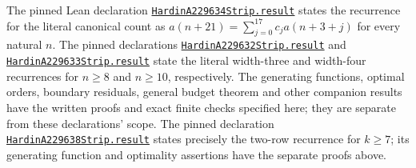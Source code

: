 \documentclass[11pt]{article}
\begin{document}


The pinned Lean declaration
\href{https://github.com/the-omega-institute/trureturing/blob/9849c0d81bfe0a953a10ad37400f5b1b61f028b5/D5/S3/StatisticalMechanics/Potts/CrossedStripDefectsWide/HardinA229634Strip.lean}{\texttt{HardinA229634Strip.result}}
states the recurrence for the literal canonical count as
$a(n+21)=\sum_{j=0}^{17}c_j a(n+3+j)$ for every natural $n$.
The pinned declarations
\href{https://github.com/the-omega-institute/trureturing/blob/9849c0d81bfe0a953a10ad37400f5b1b61f028b5/D5/S3/StatisticalMechanics/Potts/CrossedStripDefects/HardinA229632Strip.lean}{\texttt{HardinA229632Strip.result}}
and
\href{https://github.com/the-omega-institute/trureturing/blob/9849c0d81bfe0a953a10ad37400f5b1b61f028b5/D5/S3/StatisticalMechanics/Potts/CrossedStripDefects/HardinA229633Strip.lean}{\texttt{HardinA229633Strip.result}}
state the literal width-three and width-four recurrences for $n\geq8$
and $n\geq10$, respectively. The generating functions, optimal orders,
boundary residuals, general budget theorem and other companion results
have the written proofs and exact finite checks specified here;
they are separate from these declarations' scope.
The pinned declaration
\href{https://github.com/the-omega-institute/trureturing/blob/9849c0d81bfe0a953a10ad37400f5b1b61f028b5/D5/S3/StatisticalMechanics/Potts/StripDefects/HardinA229638Strip.lean}{\texttt{HardinA229638Strip.result}}
states precisely the two-row recurrence for $k\geq7$; its generating
function and optimality assertions have the separate proofs above.
\end{document}
